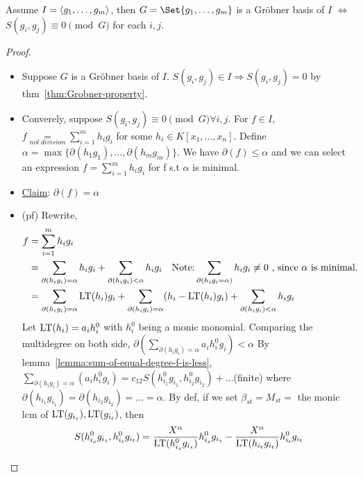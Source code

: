 \begin{theorem}
  Assume $I = \langle g_1, \dots, g_m \rangle$, then
  $G = \Set{g_1, \dots, g_m}$ is a Gr\"{o}bner basis of $I$ $\iff$
  $S(g_i, g_j) \equiv 0 \pmod{G}$ for each $i, j$.
  \begin{proof} \mbox{}
    \begin{itemize}
      \item Suppose $G$ is a Gr\"{o}bner basis of $I$.
        $S(g_i, g_j) \in I \Rightarrow S(g_i, g_j) = 0$
        by thm~\ref{thm:Grobner-property}.
      \item Converely, suppose $S(g_i, g_j) \equiv 0 \pmod G \forall i, j$.
        For $f \in I$, $f \underset{not\ division}{=}
        \sum\limits_{i=1}^m h_ig_i$ for some $h_i \in K[x_1,\dots,x_n]$.
        Define $\alpha = \max\{\partial(h_1g_1),\dots,\partial(h_mg_m)\}$.
        We have $\partial(f) \leq \alpha$ and we can select an expression
        $f = \sum\limits_{i=1}^m h_ig_i$ for f s.t $\alpha$ is minimal.
      \item \uline{Claim}: $\partial(f) = \alpha$
      \item (pf) Rewrite,
        \[
          \begin{split}f &= \sum_{i = 1}^m h_ig_i \\
            &= \sum_{\partial(h_ig_i) = \alpha} h_ig_i
              + \sum_{\partial(h_ig_i) < \alpha} h_ig_i 
        \text{ \ \ Note:}  
        \sum\limits_{\partial(h_ig_i = \alpha)}h_ig_i \neq 0 
        \text{ , since } \alpha \text{ is minimal.}\\
            &= \sum_{\partial(h_ig_i) = \alpha} \operatorname{LT}(h_i)g_i
              + \sum_{\partial(h_ig_i) = \alpha} (h_i-\operatorname{LT}(h_i)g_i)
              + \sum_{\partial(h_ig_i) < \alpha} h_ig_i
          \end{split}
        \]
          Let $\operatorname{LT}(h_i) = a_ih_i^0$ with $h_i^0$ being a monic monomial.
          Comparing the multidegree on both side,
          $\partial\left(\sum\limits_{\partial(h_ig_i) = \alpha} a_ih_i^0g_i\right)
          < \alpha$ By lemma~\ref{lemma:sum-of-equal-degree-f-is-less},
          $\underset{\partial(h_ig_i) = \alpha}{\sum}\left(a_ih_i^0g_i\right) = c_{12}S(h_{i_1}^0g_{i_1},h_{i_2}^0g_{i_2}) + \dots$(finite) where $\partial(h_{i_1}g_{i_1}) = \partial(h_{i_2}g_{i_2}) = \dots = \alpha $. By def, if we set $\beta_{st} = M_{st} =$ the monic lcm of $\operatorname{LT}(g_{i_s}), \operatorname{LT}(g_{i_t})$, then
          \[
            \begin{split}
              S(h_{i_s}^0g_{i_s}, h_{i_t}^0g_{i_t}) &= \frac{X^\alpha}{\LT(h_{i_s}^0g_{i_s})}h_{i_s}^0g_{i_s} - \frac{X^\alpha}{\LT(h_{i_t}g_{i_t})}h_{i_t}^0g_{i_t} \\

\end{split}\]
\end{itemize}
\end{proof}
\end{theorem}
